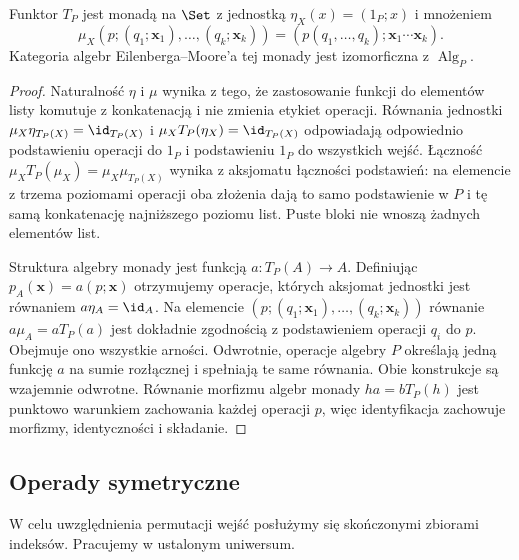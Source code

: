 \begin{stwierdzenie}\label{cat:prop:operad-monad}
Funktor $T_P$ jest monadą na $\Set$ z jednostką $\eta_X(x)=(1_P;x)$ i mnożeniem
\[
 \mu_X(p;(q_1;\mathbf x_1),\ldots,(q_k;\mathbf x_k))
 =(p(q_1,\ldots,q_k);\mathbf x_1\cdots\mathbf x_k).
\]
Kategoria algebr Eilenberga--Moore'a tej monady jest izomorficzna z $\operatorname{Alg}_P$.
\end{stwierdzenie}
\begin{proof}
Naturalność $\eta$ i $\mu$ wynika z tego, że zastosowanie funkcji do elementów listy komutuje z konkatenacją i nie zmienia etykiet operacji. Równania jednostki $\mu_X\eta_{T_P(X)}=\id_{T_P(X)}$ i $\mu_XT_P(\eta_X)=\id_{T_P(X)}$ odpowiadają odpowiednio podstawieniu operacji do $1_P$ i podstawieniu $1_P$ do wszystkich wejść. Łączność $\mu_XT_P(\mu_X)=\mu_X\mu_{T_P(X)}$ wynika z aksjomatu łączności podstawień: na elemencie z trzema poziomami operacji oba złożenia dają to samo podstawienie w $P$ i tę samą konkatenację najniższego poziomu list. Puste bloki nie wnoszą żadnych elementów list.

Struktura algebry monady jest funkcją $a:T_P(A)\to A$. Definiując $p_A(\mathbf x)=a(p;\mathbf x)$ otrzymujemy operacje, których aksjomat jednostki jest równaniem $a\eta_A=\id_A$. Na elemencie $(p;(q_1;\mathbf x_1),\ldots,(q_k;\mathbf x_k))$ równanie $a\mu_A=aT_P(a)$ jest dokładnie zgodnością z podstawieniem operacji $q_i$ do $p$. Obejmuje ono wszystkie arności. Odwrotnie, operacje algebry $P$ określają jedną funkcję $a$ na sumie rozłącznej i spełniają te same równania. Obie konstrukcje są wzajemnie odwrotne. Równanie morfizmu algebr monady $ha=bT_P(h)$ jest punktowo warunkiem zachowania każdej operacji $p$, więc identyfikacja zachowuje morfizmy, identyczności i składanie.
\end{proof}

\subsection{Operady symetryczne}

W celu uwzględnienia permutacji wejść posłużymy się skończonymi zbiorami indeksów. Pracujemy w ustalonym uniwersum.

